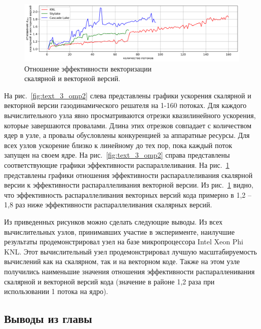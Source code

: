 \begin{figure}[ht]
\centering
\includegraphics[width=1.0\textwidth]{fig/par_openmp_scalar_vec_relation_chart.png}
\singlespacing
\caption{Отношение эффективности векторизации \\ скалярной и векторной версий.}
\label{fig:par_openmp_scalar_vec_relation_chart}
\end{figure}

На рис.~\ref{fig:text_3_omp2} слева представлены графики ускорения скалярной и векторной версии газодинамического решателя на 1-160 потоках.
Для каждого вычислительного узла явно просматриваются отрезки квазилинейного ускорения, которые завершаются провалами.
Длина этих отрезков совпадает с количеством ядер в узле, а провалы обусловлены конкуренцией за аппаратные ресурсы.
Для всех узлов ускорение близко к линейному до тех пор, пока каждый поток запущен на своем ядре.
На рис.~\ref{fig:text_3_omp2} справа представлены соответствующие графики эффективности распараллеливания.
На рис.~\ref{fig:par_openmp_scalar_vec_relation_chart} представлены графики отношения эффективности распараллеливания скалярной версии к эффективности распараллеливания векторной версии.
Из рис.~\ref{fig:par_openmp_scalar_vec_relation_chart} видно, что эффективность распараллеливания векторных версий кода примерно в 1,2 -- 1,8 раз ниже эффективности распараллеливания скалярных версий.

Из приведенных рисунков можно сделать следующие выводы.
Из всех вычислительных узлов, принимавших участие в эксперименте, наилучшие результаты продемонстрировал узел на базе микропроцессора Intel Xeon Phi KNL.
Этот вычислительный узел продемонстрировал лучшую масштабируемость вычислений как на скалярном, так и на векторном коде.
Также на этом узле получились наименьшие значения отношения эффективности распаралленивания скалярной и векторной версий кода (значение в районе 1,2 раза при использовании 1 потока на ядро).


\subsection{Выводы из главы}

